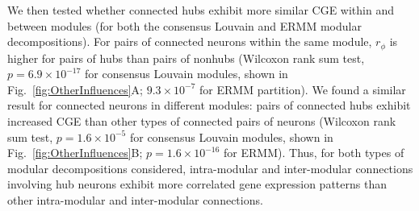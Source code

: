 \documentclass[10pt,letterpaper]{article}
\begin{document}
{%
We then tested whether connected hubs exhibit more similar CGE within and between modules (for both the consensus Louvain and ERMM modular decompositions).
For pairs of connected neurons within the same module, $r_\phi$ is higher for pairs of hubs than pairs of nonhubs (Wilcoxon rank sum test, $p = 6.9\times 10^{-17}$ for consensus Louvain modules, shown in Fig.~\ref{fig:OtherInfluences}A; $9.3 \times 10^{-7}$ for ERMM partition).
We found a similar result for connected neurons in different modules: pairs of connected hubs exhibit increased CGE than other types of connected pairs of neurons (Wilcoxon rank sum test, $p = 1.6 \times 10^{-5}$ for consensus Louvain modules, shown in Fig.~\ref{fig:OtherInfluences}B; $p = 1.6 \times 10^{-16}$ for ERMM).
Thus, for both types of modular decompositions considered, intra-modular and inter-modular connections involving hub neurons exhibit more correlated gene expression patterns than other intra-modular and inter-modular connections.

}
\end{document}
